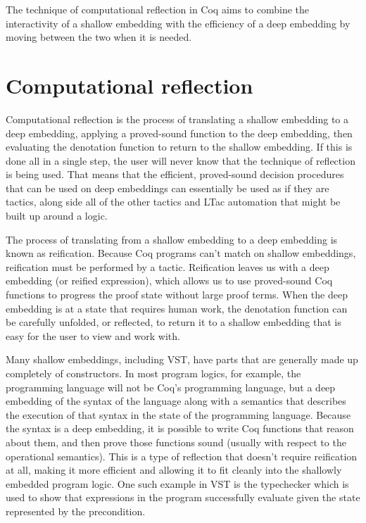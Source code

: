 \documentclass{puthesis}
\begin{document}
The technique of computational reflection in Coq aims to combine the
interactivity of a shallow embedding with the efficiency of a deep
embedding by moving between the two when it is needed.

\section{Computational reflection}

Computational reflection is the process of translating a shallow
embedding to a deep embedding, applying a proved-sound function to the
deep embedding, then evaluating the denotation function to return to
the shallow embedding. If this is done all in a single step, the user
will never know that the technique of reflection is being used. That
means that the efficient, proved-sound decision procedures that can be
used on deep embeddings can essentially be used as if they are
tactics, along side all of the other tactics and LTac automation that
might be built up around a logic. 

The process of translating from a shallow embedding to a deep
embedding is known as reification. Because Coq programs can't match on
shallow embeddings, reification must be performed by a
tactic. Reification leaves us with a deep embedding (or reified
expression), which allows us to use proved-sound Coq functions to
progress the proof state without large proof terms. When the deep
embedding is at a state that requires human work, the denotation
function can be carefully unfolded, or reflected, to return it to a
shallow embedding that is easy for the user to view and work with.


Many shallow embeddings, including VST, have parts that are generally
made up completely of constructors. In most program logics, for
example, the programming language will not be Coq's programming
language, but a deep embedding of the syntax of the language along
with a semantics that describes the execution of that syntax in the
state of the programming language. Because the syntax is a deep
embedding, it is possible to write Coq functions that reason about
them, and then prove those functions sound (usually with respect to
the operational semantics). This is a type of reflection that doesn't
require reification at all, making it more efficient and allowing it
to fit cleanly into the shallowly embedded program logic. One such
example in VST is the typechecker which is used to show that
expressions in the program successfully evaluate given the state
represented by the precondition.
\end{document}
